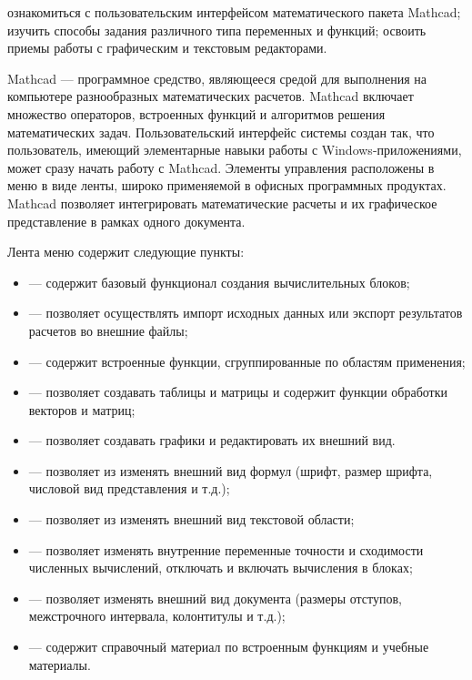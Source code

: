 
\goal ознакомиться с пользовательским интерфейсом математического пакета Mathcad; изучить способы задания различного типа переменных и функций; освоить приемы работы с графическим и текстовым редакторами.

Mathcad --- программное средство, являющееся средой для выполнения на компьютере разнообразных математических расчетов. Mathcad включает множество операторов, встроенных функций и алгоритмов решения  математических задач. Пользовательский интерфейс системы создан так, что пользователь, имеющий элементарные навыки работы с Windows-приложениями, может сразу начать работу с Mathcad. Элементы управления расположены в меню в виде ленты, широко применяемой в офисных программных продуктах. Mathcad позволяет интегрировать математические расчеты и их графическое представление в рамках одного документа.

Лента меню содержит следующие пункты:
\begin{itemize}
	\item {} --- содержит базовый функционал создания вычислительных блоков;
	\item {} --- позволяет осуществлять импорт исходных данных или экспорт результатов расчетов во внешние файлы;
	\item {} --- содержит встроенные функции, сгруппированные по областям применения;
	\item {} --- позволяет создавать таблицы и матрицы и содержит функции обработки векторов и матриц;
	\item  {} --- позволяет создавать графики и редактировать их внешний вид.
	\item {} --- позволяет из изменять внешний вид формул (шрифт, размер шрифта, числовой вид представления и т.д.);
	\item {} --- позволяет из изменять внешний вид текстовой области;
	\item {} --- позволяет изменять внутренние переменные точности и сходимости численных вычислений, отключать и включать вычисления в блоках;
	\item {} --- позволяет изменять внешний вид документа (размеры отступов, межстрочного интервала, колонтитулы и т.д.);
	\item {} --- содержит справочный материал по встроенным функциям и учебные материалы.
\end{itemize} 

